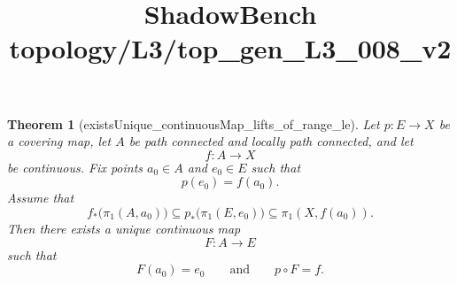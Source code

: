 \documentclass{article}
\title{ShadowBench topology/L3/top\_gen\_L3\_008\_v2}
\newtheorem{theorem}{Theorem}
\begin{document}
\maketitle

\begin{theorem}[existsUnique_continuousMap_lifts_of_range_le]
Let \(p : E \to X\) be a covering map, let \(A\) be path connected and locally path connected, and let
\[
f : A \to X
\]
be continuous. Fix points \(a_0 \in A\) and \(e_0 \in E\) such that
\[
p(e_0)=f(a_0).
\]
Assume that
\[
f_*\bigl(\pi_1(A,a_0)\bigr)\subseteq p_*\bigl(\pi_1(E,e_0)\bigr)
\subseteq \pi_1(X,f(a_0)).
\]
Then there exists a unique continuous map
\[
F : A \to E
\]
such that
\[
F(a_0)=e_0
\qquad\text{and}\qquad
p\circ F=f.
\]
\end{theorem}
\end{document}
